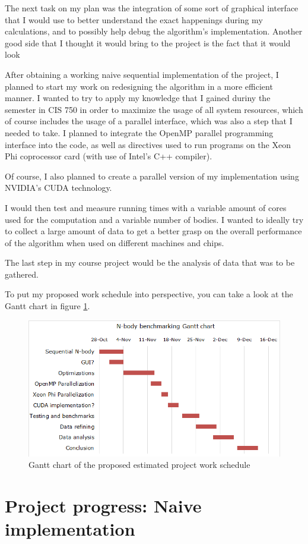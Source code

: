 \documentclass[journal]{IEEEtran}
\begin{document}
		The next task on my plan was the integration of some sort of graphical interface that I would use to better understand the exact happenings during my calculations, and to possibly help debug the algorithm's implementation. Another good side that I thought it would bring to the project is the fact that it would look
		
		After obtaining a working naive sequential implementation of the project, I planned to start my work on redesigning the algorithm in a more efficient manner. I wanted to try to apply my knowledge that I gained duriny the semester in CIS 750 in order to maximize the usage of all system resources, which of course includes the usage of a parallel interface, which was also a step that I needed to take. I planned to integrate the OpenMP parallel programming interface into the code, as well as directives used to run programs on the Xeon Phi coprocessor card (with use of Intel's C++ compiler).
		
		Of course, I also planned to create a parallel version of my implementation using NVIDIA’s CUDA technology.
		
		I would then test and measure running times with a variable amount of cores used for the computation and a variable number of bodies. I wanted to ideally try to collect a large amount of data to get a better grasp on the overall performance of the algorithm when used on different machines and chips.
		
		The last step in my course project would be the analysis of data that was to be gathered.
		
		To put my proposed work schedule into perspective, you can take a look at the Gantt chart in figure \ref{gantt}.
		
		\begin{figure}[ht]
			\centering
			\includegraphics[width=.5\textwidth]{gantt.png}
			\caption{\label{gantt}Gantt chart of the proposed estimated project work schedule}
		\end{figure} 
		
	\newpage
	\section{Project progress: Naive implementation}
	
\end{document}
